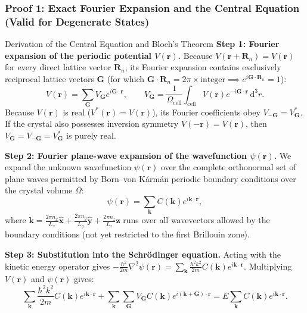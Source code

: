 \documentclass[11pt,a4paper]{article}
\newcommand{\vb}[1]{\mathbf{#1}}
\newcommand{\hb}{\hbar}
\newcommand{\hbarsq}{\hb^2}
\newcommand{\dd}{\mathrm{d}}
\newcommand{\kk}{\mathbf{k}}
\newcommand{\GG}{\mathbf{G}}
\newcommand{\RR}{\mathbf{R}}
\newcommand{\rvec}{\mathbf{r}}
\begin{document}
\subsubsection{Proof 1: Exact Fourier Expansion and the Central Equation (Valid for Degenerate States)}
\begin{methodbox}{Derivation of the Central Equation and Bloch's Theorem}
\textbf{Step 1: Fourier expansion of the periodic potential $V(\rvec)$.}
Because $V(\rvec + \RR_n) = V(\rvec)$ for every direct lattice vector $\RR_n$, its Fourier expansion contains exclusively reciprocal lattice vectors $\GG$ (for which $\GG\cdot\RR_n = 2\pi \times \text{integer} \implies e^{i\GG\cdot\RR_n} = 1$):
\begin{equation}
    V(\rvec) = \sum_{\GG} V_{\GG} e^{i\GG\cdot\rvec}, \qquad V_{\GG} = \frac{1}{\Omega_{\mathrm{cell}}}\int_{\mathrm{cell}} V(\rvec)e^{-i\GG\cdot\rvec}\,\dd^3 r.
    \label{eq:VG_fourier_def}
\end{equation}
Because $V(\rvec)$ is real ($V^*(\rvec) = V(\rvec)$), its Fourier coefficients obey $V_{-\GG} = V_{\GG}^*$. If the crystal also possesses inversion symmetry $V(-\rvec) = V(\rvec)$, then $V_{\GG} = V_{-\GG} = V_{\GG}^*$ is purely real.

\textbf{Step 2: Fourier plane-wave expansion of the wavefunction $\psi(\rvec)$.}
We expand the unknown wavefunction $\psi(\rvec)$ over the complete orthonormal set of plane waves permitted by Born--von K\'arm\'an periodic boundary conditions over the crystal volume $\Omega$:
\begin{equation}
    \psi(\rvec) = \sum_{\kk} C(\kk) e^{i\kk\cdot\rvec},
\end{equation}
where $\kk = \frac{2\pi n_x}{L_x}\hat{\vb{x}} + \frac{2\pi n_y}{L_y}\hat{\vb{y}} + \frac{2\pi n_z}{L_z}\hat{\vb{z}}$ runs over all wavevectors allowed by the boundary conditions (not yet restricted to the first Brillouin zone).

\textbf{Step 3: Substitution into the Schr\"odinger equation.}
Acting with the kinetic energy operator gives $-\frac{\hbarsq}{2m}\nabla^2\psi(\rvec) = \sum_{\kk}\frac{\hbarsq k^2}{2m}C(\kk)e^{i\kk\cdot\rvec}$. Multiplying $V(\rvec)$ and $\psi(\rvec)$ gives:
\begin{equation}
    \sum_{\kk}\frac{\hbarsq k^2}{2m}C(\kk)e^{i\kk\cdot\rvec} + \sum_{\kk}\sum_{\GG} V_{\GG} C(\kk) e^{i(\kk+\GG)\cdot\rvec} = E \sum_{\kk} C(\kk) e^{i\kk\cdot\rvec}.
    \label{eq:central_sub}
\end{equation}


\end{methodbox}
\end{document}

